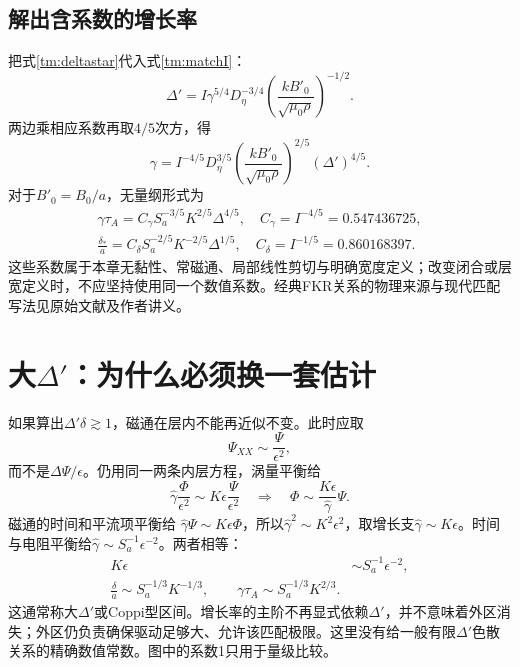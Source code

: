\subsection{解出含系数的增长率}
把式\eqref{tm:deltastar}代入式\eqref{tm:matchI}：
\begin{equation}
 \Delta'=I\gamma^{5/4}D_\eta^{-3/4}
 \left(\frac{kB'_0}{\sqrt{\mu_0\rho}}\right)^{-1/2}.
\end{equation}
两边乘相应系数再取$4/5$次方，得
\begin{equation}
 \gamma=I^{-4/5}D_\eta^{3/5}
 \left(\frac{kB'_0}{\sqrt{\mu_0\rho}}\right)^{2/5}(\Delta')^{4/5}.
\end{equation}
对于$B'_0=B_0/a$，无量纲形式为
\begin{align}
 \boxed{\gamma\tau_A=C_\gamma S_a^{-3/5}K^{2/5}\Delta^{4/5},\quad
 C_\gamma=I^{-4/5}=0.547436725,}\label{tm:FKRexact}\\
 \frac{\delta_*}{a}=C_\delta S_a^{-2/5}K^{-2/5}\Delta^{1/5},\quad
 C_\delta=I^{-1/5}=0.860168397.
 \label{tm:FKRwidthexact}
\end{align}
这些系数属于本章无黏性、常磁通、局部线性剪切与明确宽度定义；改变闭合或层宽定义时，不应坚持使用同一个数值系数。经典FKR关系的物理来源与现代匹配写法见原始文献及作者讲义。\citep{TMFKR1963,TMFitzMatching}

\section{大\texorpdfstring{$\Delta'$}{Delta prime}：为什么必须换一套估计}
如果算出$\Delta'\delta\gtrsim1$，磁通在层内不能再近似不变。此时应取
\begin{equation}
 \Psi_{XX}\sim\frac{\Psi}{\epsilon^2},
\end{equation}
而不是$\Delta\Psi/\epsilon$。仍用同一两条内层方程，涡量平衡给
\begin{equation}
 \hat\gamma\frac{\Phi}{\epsilon^2}\sim K\epsilon\frac{\Psi}{\epsilon^2}
 \quad\Rightarrow\quad \Phi\sim\frac{K\epsilon}{\hat\gamma}\Psi.
\end{equation}
磁通的时间和平流项平衡给
$\hat\gamma\Psi\sim K\epsilon\Phi$，所以$\hat\gamma^2\sim K^2\epsilon^2$，取增长支$\hat\gamma\sim K\epsilon$。时间与电阻平衡给$\hat\gamma\sim S_a^{-1}\epsilon^{-2}$。两者相等：
\begin{align}
 K\epsilon&\sim S_a^{-1}\epsilon^{-2},\\
 \boxed{\frac{\delta}{a}\sim S_a^{-1/3}K^{-1/3},\qquad
 \gamma\tau_A\sim S_a^{-1/3}K^{2/3}.}
 \label{tm:Coppi}
\end{align}
这通常称大$\Delta'$或Coppi型区间。增长率的主阶不再显式依赖$\Delta'$，并不意味着外区消失；外区仍负责确保驱动足够大、允许该匹配极限。这里没有给一般有限$\Delta'$色散关系的精确数值常数。图中的系数1只用于量级比较。\citep{TMLoureiro2007}

